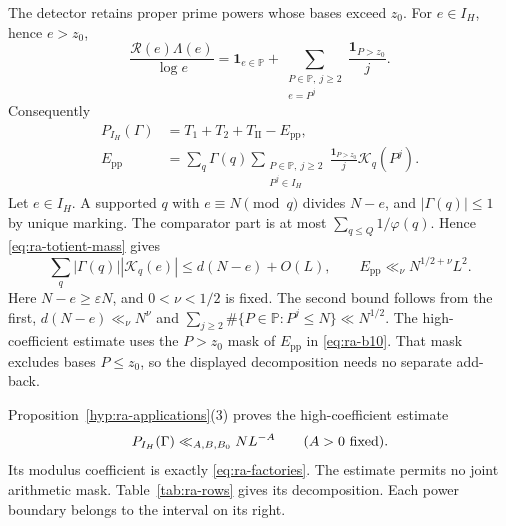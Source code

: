 The detector retains proper prime powers whose bases exceed \(z_0\).
For \(e\in I_H\), hence \(e>z_0\),
\begin{equation}\label{eq:ra-proper-power-detector}
 \frac{\mathcal R(e)\Lambda(e)}{\log e}
 =\mathbf1_{e\in\mathbb P}
  +\sum_{\substack{P\in\mathbb P,\ j\ge2\\e=P^j}}
                                      \frac{\mathbf1_{P>z_0}}j.
\end{equation}
Consequently
\begin{equation}\label{eq:ra-b10}
\begin{aligned}
 P_{I_H}(\Gamma)&=T_1+T_2+T_{\mathrm{II}}-E_{\mathrm{pp}},\\
 E_{\mathrm{pp}}&=\sum_q\Gamma(q)
   \sum_{\substack{P\in\mathbb P,\ j\ge2\\P^j\in I_H}}
           \frac{\mathbf1_{P>z_0}}j\mathcal K_q(P^j).
\end{aligned}
\end{equation}
Let \(e\in I_H\).
A supported \(q\) with \(e\equiv N\pmod q\) divides
\(N-e\), and \(|\Gamma(q)|\le1\) by unique marking.
The comparator part is at most \(\sum_{q\le Q}1/\varphi(q)\). Hence \eqref{eq:ra-totient-mass}
gives
\begin{equation}\label{eq:ra-proper-power-bound}
 \sum_q|\Gamma(q)||\mathcal K_q(e)|\le d(N-e)+O(L),
 \qquad E_{\mathrm{pp}}\ll_\nu N^{1/2+\nu}L^2.
\end{equation}
Here \(N-e\ge\varepsilon N\), and \(0<\nu<1/2\) is fixed. The second bound
follows from the first, \(d(N-e)\ll_\nu N^{\nu}\) and
\(\sum_{j\ge2}\#\{P\in\mathbb P:P^j\le N\}\ll N^{1/2}\).
The high-coefficient estimate uses the \(P>z_0\) mask of
\(E_{\mathrm{pp}}\) in \eqref{eq:ra-b10}. That mask excludes bases
\(P\le z_0\),
so the displayed decomposition needs no separate add-back.

Proposition~\ref{hyp:ra-applications}(3) proves the high-coefficient estimate
\begin{equation}\label{eq:ra-ra1}
 P_{I_H}(\Gamma)\ll_{A,B,B_0}NL^{-A}
 \qquad(A>0\ \hbox{fixed}).
\end{equation}
Its modulus coefficient is exactly \eqref{eq:ra-factories}.
The estimate permits no joint arithmetic mask.
Table~\ref{tab:ra-rows} gives its decomposition.
Each power boundary belongs to the interval on its right.

